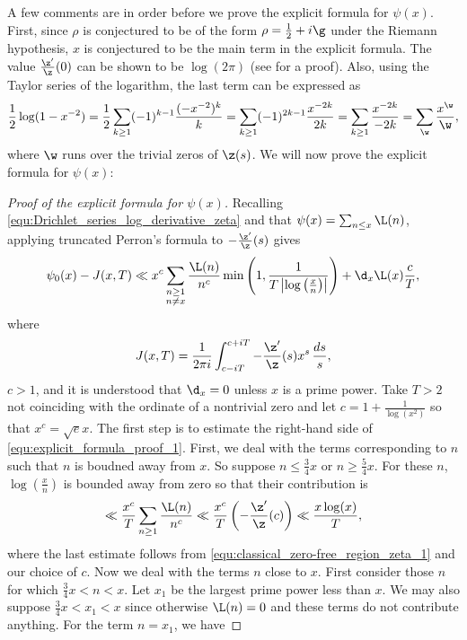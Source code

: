       A few comments are in order before we prove the explicit formula for $\psi(x)$. First, since $\rho$ is conjectured to be of the form $\rho = \frac{1}{2}+i\g$ under the Riemann hypothesis, $x$ is conjectured to be the main term in the explicit formula. The value $\frac{\z'}{\z}(0)$ can be shown to be $\log(2\pi)$ (see \cite{davenport1980multiplicative} for a proof). Also, using the Taylor series of the logarithm, the last term can be expressed as
      \[
        \frac{1}{2}\log(1-x^{-2}) = \frac{1}{2}\sum_{k \ge 1}(-1)^{k-1}\frac{(-x^{-2})^{k}}{k} = \sum_{k \ge 1}(-1)^{2k-1}\frac{x^{-2k}}{2k} = \sum_{k \ge 1}\frac{x^{-2k}}{-2k} = \sum_{\w}\frac{x^{\w}}{\w},
      \]
      where $\w$ runs over the trivial zeros of $\z(s)$. We will now prove the explicit formula for $\psi(x)$:

      \begin{proof}[Proof of the explicit formula for $\psi(x)$]
        Recalling \cref{equ:Drichlet_series_log_derivative_zeta} and that $\psi(x) = \sum_{n \le x}\L(n)$, applying truncated Perron's formula to $-\frac{\z'}{\z}(s)$ gives
        \begin{equation}\label{equ:explicit_formula_proof_1}
          \psi_{0}(x)-J(x,T) \ll x^{c}\sum_{\substack{n \ge 1 \\ n \neq x}}\frac{\L(n)}{n^{c}}\min\left(1,\frac{1}{T\left|\log\left(\frac{x}{n}\right)\right|}\right)+\d_{x}\L(x)\frac{c}{T},
        \end{equation}
        where
        \[
          J(x,T) = \frac{1}{2\pi i}\int_{c-iT}^{c+iT}-\frac{\z'}{\z}(s)x^{s}\,\frac{ds}{s},
        \]
        $c > 1$, and it is understood that $\d_{x} = 0$ unless $x$ is a prime power. Take $T > 2$ not coinciding with the ordinate of a nontrivial zero and let $c = 1+\frac{1}{\log(x^{2})}$ so that $x^{c} = \sqrt{e}x$. The first step is to estimate the right-hand side of \cref{equ:explicit_formula_proof_1}. First, we deal with the terms corresponding to $n$ such that $n$ is boudned away from $x$. So suppose $n \le \frac{3}{4}x$ or $n \ge \frac{5}{4}x$. For these $n$, $\log\left(\frac{x}{n}\right)$ is bounded away from zero so that their contribution is
        \begin{equation}\label{equ:explicit_formula_proof_2}
          \ll \frac{x^{c}}{T}\sum_{n \ge 1}\frac{\L(n)}{n^{c}} \ll \frac{x^{c}}{T}\left(-\frac{\z'}{\z}(c)\right) \ll \frac{x\log(x)}{T},
        \end{equation}
        where the last estimate follows from \cref{equ:classical_zero-free_region_zeta_1} and our choice of $c$. Now we deal with the terms $n$ close to $x$. First consider those $n$ for which $\frac{3}{4}x < n < x$. Let $x_{1}$ be the largest prime power less than $x$. We may also suppose $\frac{3}{4}x < x_{1} < x$ since otherwise $\L(n) = 0$ and these terms do not contribute anything. For the term $n = x_{1}$, we have

\end{proof}
